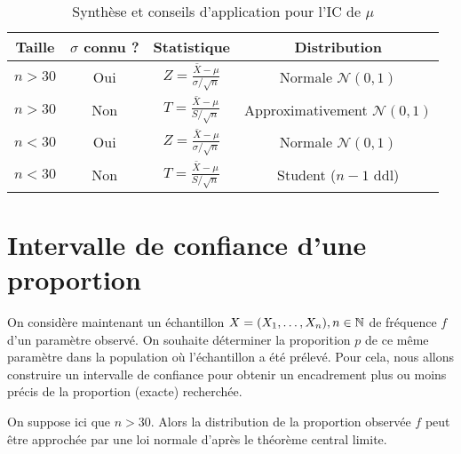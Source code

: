 \begin{table}[h]
    \centering
    \renewcommand{\arraystretch}{2} %
    \setlength{\tabcolsep}{4pt} %
    \begin{tabular}{|c|c|c|c|}
        \hline
        \textbf{Taille} & \textbf{$\sigma$ connu ?} & \textbf{Statistique} & \textbf{Distribution} \\
        \hline
        $n > 30$ & Oui & $\displaystyle Z = \frac{\bar{X} - \mu}{\sigma / \sqrt{n}}$ & Normale $\mathcal{N}(0,1)$ \\
        \hline
        $n > 30$ & Non & $\displaystyle T = \frac{\bar{X} - \mu}{S / \sqrt{n}}$ & Approximativement $\mathcal{N}(0,1)$ \\
        \hline
        $n < 30$ & Oui & $\displaystyle Z = \frac{\bar{X} - \mu}{\sigma / \sqrt{n}}$ & Normale $\mathcal{N}(0,1)$ \\
        \hline
        $n < 30$ & Non & $\displaystyle T = \frac{\bar{X} - \mu}{S / \sqrt{n}}$ & Student ($n-1$ ddl) \\
        \hline
    \end{tabular}
    \caption{Synthèse et conseils d'application pour l'IC de $\mu$}
    \label{tab:IC_synthese}
\end{table}


\section{Intervalle de confiance d'une proportion}

On considère maintenant un échantillon $X = (X_1, \dots, X_n), n \in \mathbb{N}$ de fréquence $f$ d'un paramètre observé. 
On souhaite déterminer la proporition $p$ de ce même paramètre dans la population où l'échantillon a été prélevé. 
Pour cela, nous allons construire un intervalle de confiance pour obtenir un encadrement plus ou moins précis 
de la proportion (exacte) recherchée. 

\vspace{0.3cm}

On suppose ici que $n > 30$. Alors la distribution de la proportion observée $f$ peut être approchée par une loi normale 
d'après le théorème central limite. 

\vspace{0.3cm}

